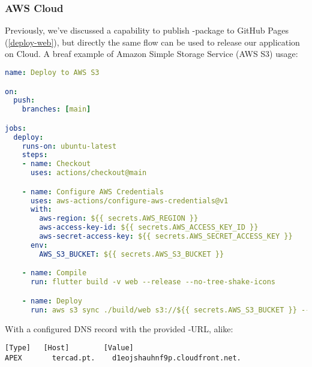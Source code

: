 
\subsubsection{AWS Cloud}

Previously, we've discussed a capability to publish -package to GitHub Pages (\ref{deploy-web}), but 
directly the same flow can be used to release our application on Cloud. A breaf example of Amazon Simple Storage 
Service (AWS S3) usage:

\begin{lstlisting}[language=yaml]
name: Deploy to AWS S3

on: 
  push:
    branches: [main]

jobs:
  deploy:
    runs-on: ubuntu-latest
    steps:
    - name: Checkout
      uses: actions/checkout@main

    - name: Configure AWS Credentials
      uses: aws-actions/configure-aws-credentials@v1
      with:
        aws-region: ${{ secrets.AWS_REGION }}
        aws-access-key-id: ${{ secrets.AWS_ACCESS_KEY_ID }}
        aws-secret-access-key: ${{ secrets.AWS_SECRET_ACCESS_KEY }}
      env:
        AWS_S3_BUCKET: ${{ secrets.AWS_S3_BUCKET }}

    - name: Compile
      run: flutter build -v web --release --no-tree-shake-icons

    - name: Deploy
      run: aws s3 sync ./build/web s3://${{ secrets.AWS_S3_BUCKET }} --delete
\end{lstlisting}

\noindent With a configured DNS record with the provided -URL, alike:

\begin{lstlisting}[language=terminal]
[Type]	 [Host]        [Value]
APEX	   tercad.pt.    d1eojshauhnf9p.cloudfront.net.
\end{lstlisting}
